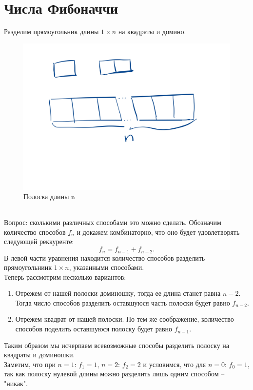 \documentclass[a4paper,14pt]{article}
\begin{document}
\section*{Числа Фибоначчи}
Разделим прямоугольник длины $1 \times n$ на квадраты и домино. 
\begin{figure}[htpb]
	\centering
	\includegraphics[scale=0.5]{images/line}
	\caption{Полоска длины n}
\end{figure}
\\Вопрос: сколькими различных способами это можно сделать. Обозначим количество способов $f_n$ и докажем комбинаторно, что оно
будет удовлетворять следующей реккуренте:
\[
	f_n = f_{n - 1} + f_{n - 2}
.\]
В левой части уравнения находится количество способов разделить прямоугольниик $1 \times n$,
указанными способами. \\
Теперь рассмотрим несколько вариантов:
\begin{enumerate}
	\item Отрежем от нашей полоски доминошку, тогда ее длина станет равна $n - 2$.
		Тогда число способов разделить оставшуюся часть полоски будет равно $f_{n - 2}$.
	\item Отрежем квадрат от нашей полоски. По тем же соображение, количество
		способов поделить оставшуюся полоску будет равно $f_{n - 1}$.
\end{enumerate}
Таким образом мы исчерпаем всевозможные способы разделить полоску на квадраты и доминошки. \\
Заметим, что при $n = 1$: $f_1 = 1$, $n = 2$: $f_2 = 2$ и 
условимся, что для $n = 0$: $f_0 = 1$,
так как полоску нулевой длины можно разделить лишь одним способом – "никак". \\
\end{document}
